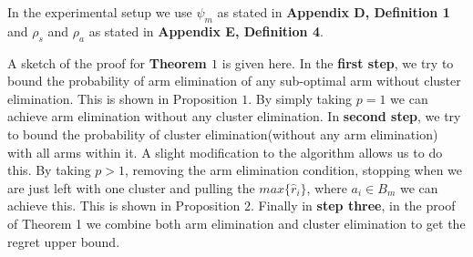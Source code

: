 \begin{remark}
\label{Result:Rem:5}
In the experimental setup we use $\psi_{m}$ as stated in \textbf{Appendix D, Definition 1} and $\rho_{s}$ and $\rho_{a}$ as stated in \textbf{Appendix E, Definition 4}.
\end{remark}

\begin{remark}
\label{Result:Rem:6}
A sketch of the proof for \textbf{Theorem $1$} is given here. In the \textbf{first step}, we try to bound the probability of arm elimination of any sub-optimal arm without cluster elimination. This is shown in Proposition $1$. By simply taking $p=1$ we can achieve arm elimination without any cluster elimination. In \textbf{second step}, we try to bound the probability of cluster elimination(without any arm elimination) with all arms within it.  A slight modification to the algorithm allows us to do this. By taking $p>1$, removing the arm elimination condition, stopping when we are just left with one cluster and pulling the $max\lbrace \hat{r}_{i}\rbrace$, where $a_{i}\in B_{m}$ we can achieve this.  This is shown in Proposition $2$. Finally in \textbf{step three}, in the proof of Theorem 1 we combine both arm elimination and cluster elimination to get the regret upper bound.  
\end{remark}
	



